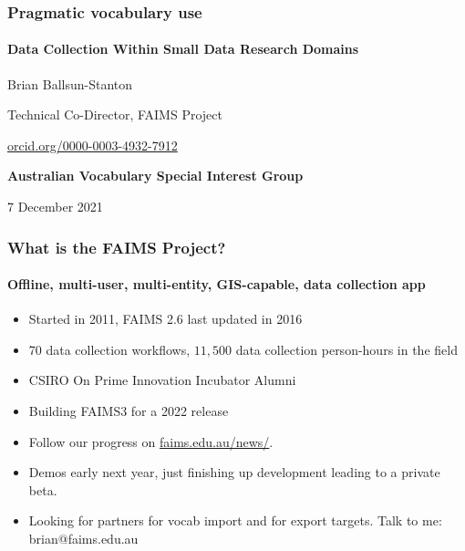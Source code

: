 \documentclass[
	aspectratio=169, %
	12pt, %
	t, %
]{beamer}
\begin{document}

\begin{titleframe} %
	\frametitle{Pragmatic vocabulary use}
	
    \framesubtitle{Data Collection Within Small Data Research Domains}
	Brian Ballsun-Stanton

    \medskip

	Technical Co-Director, FAIMS Project

    \href{https://orcid.org/0000-0003-4932-7912}{\textcolor{orcidlogocol}{\aiOrcid} \hspace{2mm} orcid.org/0000-0003-4932-7912}

    \bigskip
    
    \textbf{Australian Vocabulary Special Interest Group}
    
	7 December 2021
\end{titleframe}

\begin{frame}
	\frametitle{What is the FAIMS Project?}
	\framesubtitle{Offline, multi-user, multi-entity, GIS-capable, data collection app}
	
\begin{itemize}
    \item Started in 2011, FAIMS 2.6 last updated in 2016
    \item 70 data collection workflows, $11,500$ data collection person-hours in the field
    \item CSIRO On Prime Innovation Incubator Alumni
    \item Building FAIMS3 for a 2022 release
\end{itemize}

\begin{itemize}
    \item Follow our progress on \href{https://faims.edu.au/news/}{faims.edu.au/news/}.
    \item Demos early next year, just finishing up development leading to a private beta.
    \item Looking for partners for vocab import and for export targets. Talk to me: brian@faims.edu.au
\end{itemize}

 
\end{frame}
\end{document}
